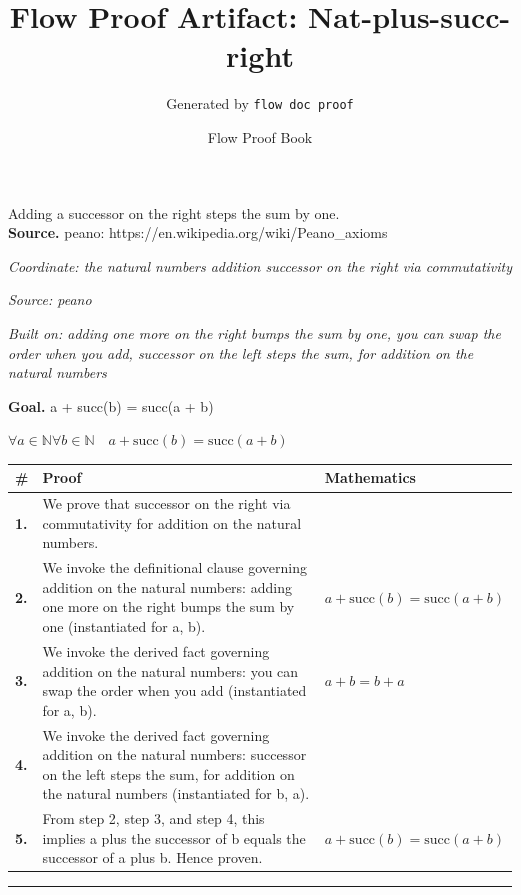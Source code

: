 \documentclass[11pt]{article}
\title{Flow Proof Artifact: Nat-plus-succ-right}
\author{Generated by \texttt{flow doc proof}}
\date{Flow Proof Book}
\theoremstyle{definition}
\begin{document}
\maketitle
Adding a successor on the right steps the sum by one.\\[0.5em]
\textbf{Source.} peano: https://en.wikipedia.org/wiki/Peano\_axioms\\[0.5em]
\bigskip
{}\par
\smallskip\noindent\textit{Coordinate: the natural numbers \cdot addition \cdot successor on the right via commutativity}\par
\smallskip\noindent\textit{Source: peano}\par
\smallskip\noindent\textit{Built on: adding one more on the right bumps the sum by one, you can swap the order when you add, successor on the left steps the sum, for addition on the natural numbers}\par
\medskip
\noindent\textbf{Goal.} a + succ(b) = succ(a + b)\par
\noindent$\displaystyle \forall a \in \mathbb{N} \forall b \in \mathbb{N}\quad a + \mathrm{succ}(b) = \mathrm{succ}(a + b)$\par
\medskip
\noindent
\begin{tabular}{@{} >{\raggedright\arraybackslash}p{} >{\raggedright\arraybackslash}p{} >{\raggedleft\arraybackslash}p{} @{}}
\textbf{\#} & \textbf{Proof} & \textbf{Mathematics} \\
\midrule
\textbf{1.} & We prove that successor on the right via commutativity for addition on the natural numbers. & \\[0.45em]
\textbf{2.} & We invoke the definitional clause governing addition on the natural numbers: adding one more on the right bumps the sum by one (instantiated for a, b). & $\displaystyle a + \mathrm{succ}(b) = \mathrm{succ}(a + b)$ \\[0.45em]
\textbf{3.} & We invoke the derived fact governing addition on the natural numbers: you can swap the order when you add (instantiated for a, b). & $\displaystyle a + b = b + a$ \\[0.45em]
\textbf{4.} & We invoke the derived fact governing addition on the natural numbers: successor on the left steps the sum, for addition on the natural numbers (instantiated for b, a). & \\[0.45em]
\textbf{5.} & From step 2, step 3, and step 4, this implies a plus the successor of b equals the successor of a plus b. Hence proven. & $\displaystyle a + \mathrm{succ}(b) = \mathrm{succ}(a + b)$ \\[0.45em]
\bottomrule
\end{tabular}
\label{thm:Nat-addition-successor_on_the_right_via_commutativity}
\par\medskip\hrule
\end{document}
